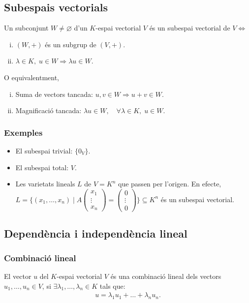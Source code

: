 \subsection{Subespais vectorials}
Un subconjunt $W \neq \varnothing$ d'un $K$-espai vectorial $V$ és un subespai vectorial de $V \Leftrightarrow$
\begin{enumerate}[i)]
    \item $(W,+)$ és un subgrup de $(V,+)$.
    \item $\lambda \in K, \; u \in W \Rightarrow \lambda u \in W$.
\end{enumerate}

O equivalentment,
\begin{enumerate}[i)]
    \item Suma de vectors tancada: $u, v \in W \Rightarrow u + v \in W$.
    \item Magnificació tancada: $\lambda u \in W, \quad \forall \lambda \in K, \; u \in W$.
\end{enumerate}

\subsubsection*{Exemples}
\begin{itemize}
    \item El subespai trivial: $\{ 0_{V} \}$.
    \item El subespai total: $V$.
    \item Les varietats lineals $L$ de $V = K^{n}$ que passen per l'origen.
        \subitem En efecte, $L = \{ (x_{1}, \dots , x_{n}) \mid A \begin{pmatrix} x_{1}  \\ \vdots \\ x_{n}  \end{pmatrix} = \begin{pmatrix} 0 \\ \vdots \\ 0 \end{pmatrix} \} \subseteq K^{n}$ és un subespai vectorial.
\end{itemize}

\subsection{Dependència i independència lineal}
\subsubsection*{Combinació lineal}
El vector $u$ del $K$-espai vectorial $V$ és una combinació lineal dels vectors $u_{1}, \dots, u_{n} \in V$, si $\exists \lambda_{1}, \dots, \lambda_{n} \in K$ tals que:
\begin{align}
    u = \lambda_{1} u_{1} + \dots + \lambda_{n} u_{n}.
\end{align}

